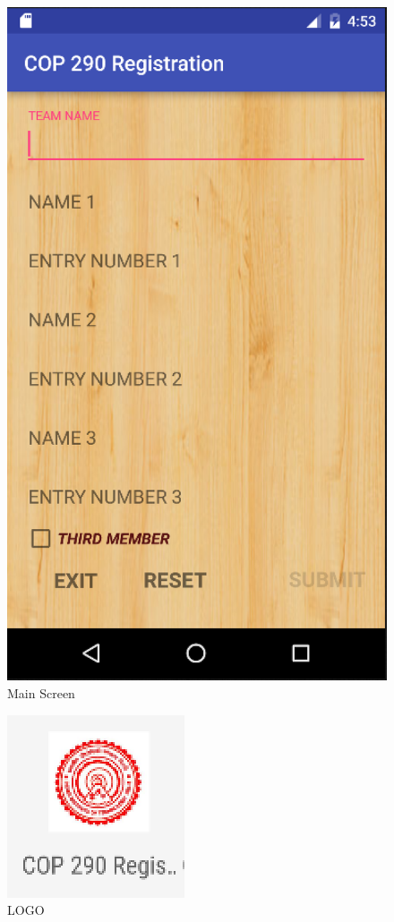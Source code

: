 \documentclass[12pt]{article}
\begin{document}
\begin{figure}[!ht]
	\centering
	\includegraphics[scale=.7]{MAINSCREENFINAL.png}
	\caption{Main Screen}
\end{figure}
\begin{figure}
	\centering
	\includegraphics[scale=.7]{LOGO.png}
	\caption{LOGO}
\end{figure}
\end{document}
